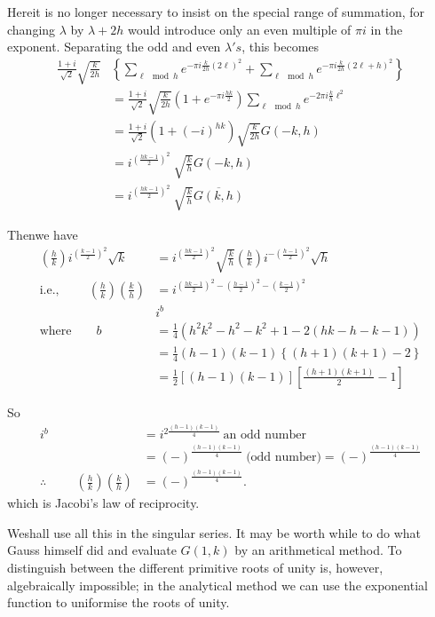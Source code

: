 Here\pageoriginale it is no longer necessary to insist on the special
range of summation, for changing $\lambda$ by $\lambda + 2 h$ would
introduce only an even multiple of $\pi i$ in the exponent. Separating
the odd and even $\lambda's$, this becomes 
\begin{align*}
  \frac{1+i}{\sqrt{2}} \sqrt{\frac{k}{2h}} & \left\{ \sum_{\ell \mod h}
  e^{- \pi i \frac{k}{2h} (2 \ell)^2} + \sum_{\ell \mod h}e^{- \pi i
    \frac{k}{2h} (2 \ell +h)^2} \right\}\\
  & = \frac{1+i}{\sqrt{2}} \sqrt{\frac{k}{2h}} \left(1+ e^{- \pi i
    \frac{hk}{2}}\right) \sum_{\ell \mod h} e^{-2 \pi i \frac{k}{h}
  \ell^2}\\
  & = \frac{1+i}{\sqrt{2}} \left( 1+ (-i)^{hk}\right)
  \sqrt{\frac{k}{2h}} G(- k, h)\\
  & = i^{\left( \frac{hk-1}{2}\right)^2}~ \sqrt{\frac{k}{h}} G(-k, h)\\
  & = i^{\left( \frac{hk-1}{2}\right)^2}~ \sqrt{\frac{k}{h}}
  \overline{G(k, h)}
\end{align*}

Then\pageoriginale we have 
\begin{align*}
  \left(\frac{h}{k}\right) i^{\left(\frac{k-1}{2}\right)^2}\sqrt{k} &
  = i^{\left(\frac{hk-1}{2}\right)^2}\sqrt{\frac{k}{h}}
  \left(\frac{h}{k}\right) i^{- \left(\frac{h-1}{2}\right)^2}
  \sqrt{h}\\
  \text{i.e.,} \hspace{1cm} \left(\frac{h}{k}\right)
  \left(\frac{k}{h}\right) & = i^{\left(\frac{hk-1}{2}\right)^2 -
  \left(\frac{h-1}{2}\right)^2 -
  \left(\frac{k-1}{2}\right)^2}\\
  & i^b\\
  \text{where}\qquad b & = \frac{1}{4} \left(h^2 k^2 - h^2 -
  k^2 +1 - 2(hk - h - k -1) \right)\\
  & = \frac{1}{4} (h-1) (k-1)\left\{(h+1)(k+1)-2 \right\}\\
  & = \frac{1}{2} \left[(h-1)(k-1)\right] \left[\frac{(h+1)(k+1)}{2}-1
    \right]
\end{align*}

So
\begin{align*}
  i^b & = i^{2\frac{(h-1)(k-1)}{4}} ~\text{an odd number}\\
    & = (-)^{\frac{(h-1)(k-1)}{4}} ~\text{(odd number)} =
      (-)^{\frac{(h-1)(k-1)}{4}}\\
      \therefore \hspace{1cm} \left(\frac{h}{k}\right)
      \left(\frac{k}{h}\right) & = (-)^{\frac{(h-1)(k-1)}{4}}. 
\end{align*}
which is Jacobi's law of reciprocity.

We\pageoriginale shall use all this in the singular series. It may be
worth while to do what Gauss himself did and evaluate $G(1, k)$ by an
arithmetical method. To distinguish between the different primitive
roots of unity is, however, algebraically impossible; in the analytical
method we can use the exponential function to uniformise the roots of
unity.
